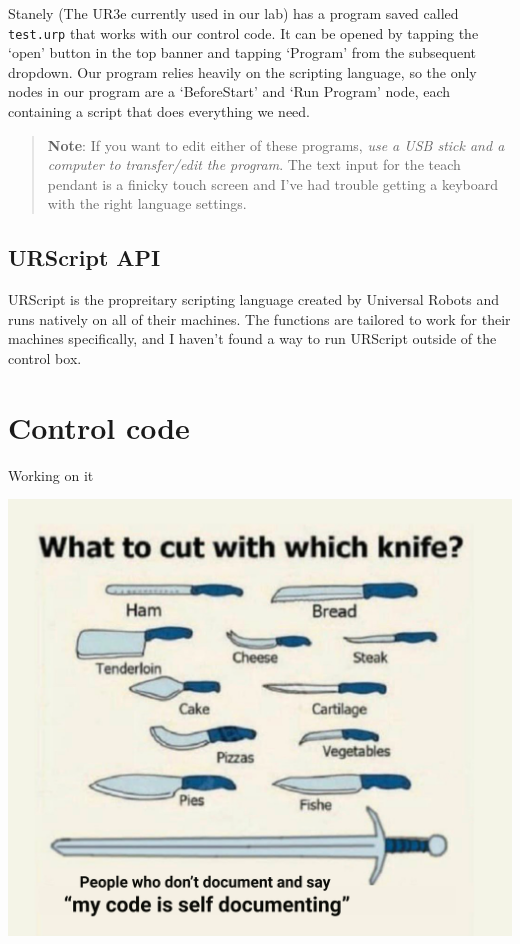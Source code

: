 \documentclass[11pt]{article}
\begin{document}
Stanely (The UR3e currently used in our lab) has a program saved called \texttt{test.urp} that works with our control code.
It can be opened by tapping the `open' button in the top banner and tapping `Program' from the subsequent dropdown. 
Our program relies heavily on the scripting language, so the only nodes in our program are a `BeforeStart' and `Run Program' node, each containing a script that does everything we need.
\begin{quote}
\textbf{Note}: If you want to edit either of these programs, \textit{use a USB stick and a computer to transfer/edit the program}. The text input for the teach pendant is a finicky touch screen and I've had trouble getting a keyboard with the right language settings.
\end{quote}

\subsection{URScript API}\label{sec:urscript}
URScript is the propreitary scripting language created by Universal Robots and runs natively on all of their machines. The functions are tailored to work for their machines specifically, and I haven't found a way to run URScript outside of the control box.
\section{Control code}\label{sec:control_code}
Working on it
\begin{center}
    \includegraphics[width=.9\linewidth]{figures/control_code_loading_image.png}
\end{center}
\end{document}
